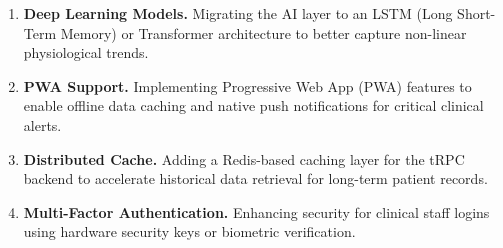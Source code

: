 \begin{enumerate}
    \item \textbf{Deep Learning Models.} Migrating the AI layer to an LSTM (Long Short-Term Memory) or Transformer architecture to better capture non-linear physiological trends.
    \item \textbf{PWA Support.} Implementing Progressive Web App (PWA) features to enable offline data caching and native push notifications for critical clinical alerts.
    \item \textbf{Distributed Cache.} Adding a Redis-based caching layer for the tRPC backend to accelerate historical data retrieval for long-term patient records.
    \item \textbf{Multi-Factor Authentication.} Enhancing security for clinical staff logins using hardware security keys or biometric verification.
\end{enumerate}
